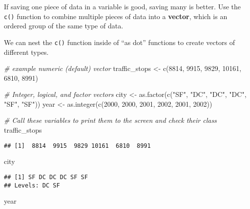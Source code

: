 \documentclass[
]{article}
\newenvironment{Shaded}{\begin{snugshade}}{\end{snugshade}}
\newcommand{\CommentTok}[1]{\textcolor[rgb]{0.56,0.35,0.01}{\textit{#1}}}
\newcommand{\DecValTok}[1]{\textcolor[rgb]{0.00,0.00,0.81}{#1}}
\newcommand{\FunctionTok}[1]{\textcolor[rgb]{0.00,0.00,0.00}{#1}}
\newcommand{\NormalTok}[1]{#1}
\newcommand{\OtherTok}[1]{\textcolor[rgb]{0.56,0.35,0.01}{#1}}
\newcommand{\StringTok}[1]{\textcolor[rgb]{0.31,0.60,0.02}{#1}}
\begin{document}
If saving one piece of data in a variable is good, saving many is
better. Use the \texttt{c()} function to combine multiple pieces of data
into a \textbf{vector}, which is an ordered group of the same type of
data.

We can nest the \texttt{c()} function inside of ``as dot'' functions to
create vectors of different types.

\begin{Shaded}
\begin{Highlighting}[]
\CommentTok{\# example numeric (default) vector}
\NormalTok{traffic\_stops }\OtherTok{\textless{}{-}} \FunctionTok{c}\NormalTok{(}\DecValTok{8814}\NormalTok{, }\DecValTok{9915}\NormalTok{, }\DecValTok{9829}\NormalTok{, }\DecValTok{10161}\NormalTok{, }\DecValTok{6810}\NormalTok{, }\DecValTok{8991}\NormalTok{)}

\CommentTok{\# Integer, logical, and factor vectors}
\NormalTok{city }\OtherTok{\textless{}{-}} \FunctionTok{as.factor}\NormalTok{(}\FunctionTok{c}\NormalTok{(}\StringTok{"SF"}\NormalTok{, }\StringTok{"DC"}\NormalTok{, }\StringTok{"DC"}\NormalTok{, }\StringTok{"DC"}\NormalTok{, }\StringTok{"SF"}\NormalTok{, }\StringTok{"SF"}\NormalTok{))}
\NormalTok{year }\OtherTok{\textless{}{-}} \FunctionTok{as.integer}\NormalTok{(}\FunctionTok{c}\NormalTok{(}\DecValTok{2000}\NormalTok{, }\DecValTok{2000}\NormalTok{, }\DecValTok{2001}\NormalTok{, }\DecValTok{2002}\NormalTok{, }\DecValTok{2001}\NormalTok{, }\DecValTok{2002}\NormalTok{))}

\CommentTok{\# Call these variables to print them to the screen and check their class}
\NormalTok{traffic\_stops}
\end{Highlighting}
\end{Shaded}

\begin{verbatim}
## [1]  8814  9915  9829 10161  6810  8991
\end{verbatim}

\begin{Shaded}
\begin{Highlighting}[]
\NormalTok{city}
\end{Highlighting}
\end{Shaded}

\begin{verbatim}
## [1] SF DC DC DC SF SF
## Levels: DC SF
\end{verbatim}

\begin{Shaded}
\begin{Highlighting}[]
\NormalTok{year}
\end{Highlighting}
\end{Shaded}
\end{document}

